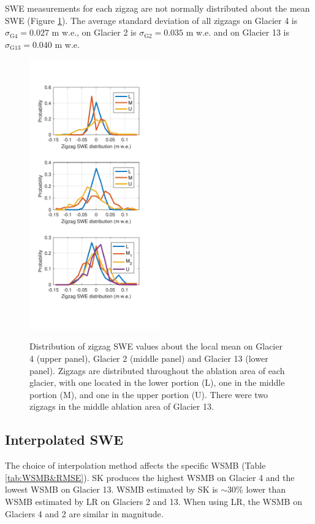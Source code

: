 \documentclass[twocolumn,letterpaper]{igs}
\begin{document}
SWE measurements for each zigzag are not normally distributed about the mean SWE (Figure \ref{fig:ZigzagHistogram}). The average standard deviation of all zigzags on Glacier 4 is $\sigma_{\mathrm{G4}} =  0.027$ m w.e., on Glacier 2 is $\sigma_{\mathrm{G2}} =  0.035$ m w.e. and on Glacier 13 is $\sigma_{\mathrm{G13}} =  0.040$ m w.e.

\begin{figure}
	\centering
	\includegraphics[width =0.5\textwidth]{ZigzagHistogram.pdf}\\
	\caption{Distribution of zigzag SWE values about the local mean on Glacier 4 (upper panel), Glacier 2 (middle panel) and Glacier 13 (lower panel). Zigzags are distributed throughout the ablation area of each glacier, with one located in the lower portion (L), one in the middle portion (M), and one in the upper portion (U). There were two zigzags in the middle ablation area of Glacier 13.}
	\label{fig:ZigzagHistogram}
\end{figure}

\subsection{Interpolated SWE}

The choice of interpolation method affects the specific WSMB (Table \ref{tab:WSMB&RMSE}). SK produces the highest WSMB on Glacier 4 and the lowest WSMB on Glacier 13. WSMB estimated by SK is $\sim$30\% lower than WSMB estimated by LR on Glaciers 2 and 13. When using LR, the WSMB on Glaciers 4 and 2 are similar in magnitude.
\end{document}
